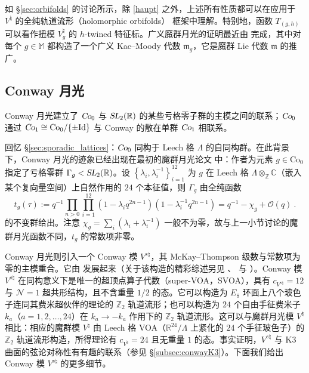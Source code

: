 \documentclass[11pt,a4paper,fontset=windows]{ctexart}
\numberwithin{equation}{section}
\newcommand{\SL}{\operatorname{\textsl{SL}}}      %
\newcommand{\Co}{\operatorname{\textsl{Co}}}      %
\newcommand{\RR}{\mathbb{R}}
\newcommand{\ZZ}{\mathbb{Z}}
\newcommand{\MM}{\mathbb{M}}
\def\t{\tau}
\begin{document}
如 \S\ref{sec:orbifolds} 的讨论所示，除 \ref{haupt} 之外，上述所有性质都可以在应用于 $V^\natural$ 的全纯轨道流形（holomorphic orbifolds）\cite{DixonL.1988Batb} 框架中理解。特别地，函数 $T_{(g,h)}$ 可以看作扭模 $V^\natural_g$ 的 $h$-twined 特征标。广义魔群月光的证明最近由 \cite{carnahan2012generalized} 完成，其中对每个 $g\in \MM$ 都构造了一个广义 Kac–Moody 代数 ${\mathfrak m}_g$，它是魔群 Lie 代数 $\mathfrak{m}$ 的推广。


\subsection{Conway 月光}
\label{sec:conway_moonshine}

Conway 月光建立了 $\Co_0$ 与 $\SL_2(\RR)$ 的某些亏格零子群的主模之间的联系；$\Co_0$ 通过 $\Co_1\cong\text{Co}_0/\lbrace\pm\text{Id}\rbrace$ 与 Conway 的散在单群 $\Co_1$ 相联系。

回忆 \S\ref{sec:sporadic_lattices}：$\Co_0$ 同构于 Leech 格 $\Lambda$ 的自同构群。在此背景下，Conway 月光的迹象已经出现在最初的魔群月光论文 \cite{conway_norton} 中：作者为元素 $g\in\text{Co}_0$ 指定了亏格零群 $\Gamma_g<\SL_2(\mathbb{R})$。设 $\left\lbrace\lambda_i,\lambda_i^{-1}\right\rbrace_{i=1}^{12}$ 为 $g$ 在 Leech 格 $\Lambda\otimes_{\mathbb{Z}}\mathbb{C}$（嵌入某个复向量空间）上自然作用的 $24$ 个本征值，则 $\Gamma_g$ 由全纯函数
\begin{equation}
t_g(\t):=q^{-1}\prod_{n>0}\prod_{i=1}^{12}\left(1-\lambda_iq^{2n-1}\right)\left(1-\lambda_i^{-1}q^{2n-1}\right)=q^{-1}-\chi_g+\mathcal{O}(q)~. 
\end{equation}
的不变群给出。注意 $\chi_g = \sum_i (\lambda_i+\lambda_i^{-1})$ 一般不为零，故与上一小节讨论的魔群月光函数不同，$t_g$ 的常数项非零。


Conway 月光则引入一个 Conway 模 $V^{s\natural}$，其 McKay–Thompson 级数与常数项为零的主模重合。它由 \cite{DuncanJohnF.2007SfCl, DuncanJohnf.r.2015TMMF} 发展起来（关于该构造的精彩综述另见 \cite{MR3465528}、\cite{Cheng:2014owa} 与 \cite{Harrison:2018joy}）。Conway 模 $V^{s\natural}$ 在同构意义下是唯一的超顶点算子代数（super-VOA，SVOA），具有 $c_{V^{s\natural}}=12$ 与 $\mathcal{N}=1$ 超共形结构，且不含重量 $1/2$ 的态。它可以构造为 $E_8$ 环面上八个玻色子连同其费米超伙伴的理论的 $\ZZ_2$ 轨道流形；也可以构造为 $24$ 个自由手征费米子 $k_a$（$a=1,2,\dots,24$）在 $k_a \to -k_a$ 作用下的 $\ZZ_2$ 轨道流形。这可以与魔群月光模 $V^\natural$ 相比：相应的魔群模 $V^\natural$ 由 Leech 格 VOA（$\RR^{24}/\Lambda$ 上紧化的 $24$ 个手征玻色子）的 $\ZZ_2$ 轨道流形构造，所得理论有 $c_{V^\natural}=24$ 且无重量 $1$ 的态。事实证明，$V^{s\natural}$ 与 K3 曲面的弦论对称性有有趣的联系（参见 \S\ref{subsec:conwayK3}）。下面我们给出 Conway 模 $V^{s\natural}$ 的更多细节。
\end{document}

